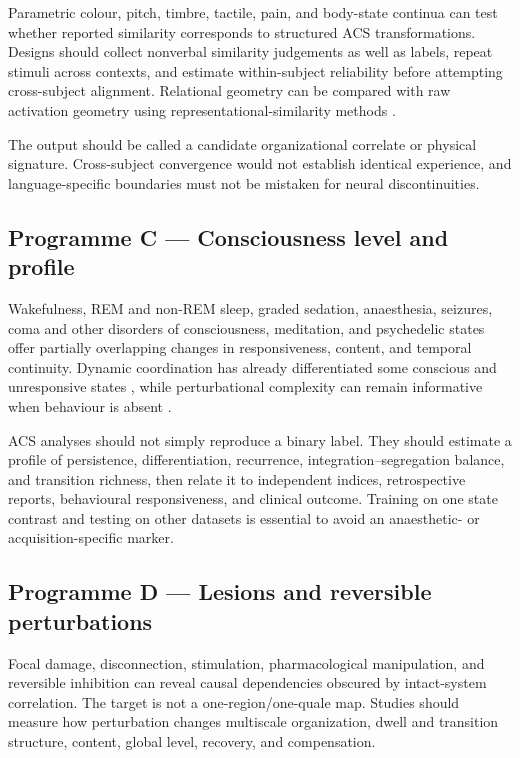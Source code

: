 \documentclass[
  11pt,
  a4paper,
]{article}
\begin{document}
Parametric colour, pitch, timbre, tactile, pain, and body-state continua
can test whether reported similarity corresponds to structured ACS
transformations. Designs should collect nonverbal similarity judgements
as well as labels, repeat stimuli across contexts, and estimate
within-subject reliability before attempting cross-subject alignment.
Relational geometry can be compared with raw activation geometry using
representational-similarity methods \citep{nili2014}.

The output should be called a candidate organizational correlate or
physical signature. Cross-subject convergence would not establish
identical experience, and language-specific boundaries must not be
mistaken for neural discontinuities.

\subsection{Programme C --- Consciousness level and
profile}\label{programme-c-consciousness-level-and-profile}

Wakefulness, REM and non-REM sleep, graded sedation, anaesthesia,
seizures, coma and other disorders of consciousness, meditation, and
psychedelic states offer partially overlapping changes in
responsiveness, content, and temporal continuity. Dynamic coordination
has already differentiated some conscious and unresponsive states
\citep{demertzi2019, luppi2019}, while perturbational complexity can
remain informative when behaviour is absent
\citep{casali2013, sarasso2015}.

ACS analyses should not simply reproduce a binary label. They should
estimate a profile of persistence, differentiation, recurrence,
integration--segregation balance, and transition richness, then relate
it to independent indices, retrospective reports, behavioural
responsiveness, and clinical outcome. Training on one state contrast and
testing on other datasets is essential to avoid an anaesthetic- or
acquisition-specific marker.

\subsection{Programme D --- Lesions and reversible
perturbations}\label{programme-d-lesions-and-reversible-perturbations}

Focal damage, disconnection, stimulation, pharmacological manipulation,
and reversible inhibition can reveal causal dependencies obscured by
intact-system correlation. The target is not a one-region/one-quale map.
Studies should measure how perturbation changes multiscale organization,
dwell and transition structure, content, global level, recovery, and
compensation.
\end{document}
